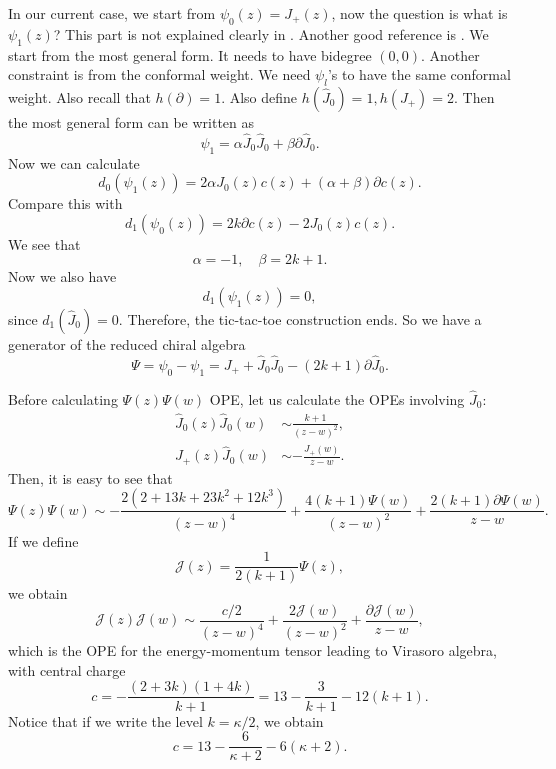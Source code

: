 \documentclass[a4paper,11pt]{article}
\begin{document}
In our current case, we start from $\psi_0(z) = J_+(z)$, now the question is what is $\psi_1(z)$? This part is not explained clearly in \cite{Beem:2014rza}. Another good reference is \cite{deBoer:1993iz}. We start from the most general form. It needs to have bidegree $(0,0)$. Another constraint is from the conformal weight. We need $\psi_l$'s to have the same conformal weight. Also recall that $h(\partial) = 1$. Also define $h(\hat{J}_0) = 1, h(J_+) = 2$. Then the most general form can be written as
\begin{equation}
    \psi_1 = \alpha \hat{J}_0 \hat{J}_0 + \beta \partial \hat{J}_0.
\end{equation}
Now we can calculate 
\begin{equation}
    d_0(\psi_1(z)) = 2\alpha J_0(z) c(z) + (\alpha + \beta) \partial c(z).
\end{equation}
Compare this with
\begin{equation}
    d_1(\psi_0(z)) = 2k\partial c(z) - 2{J}_0(z) c(z).
\end{equation}
We see that
\begin{equation}
    \alpha = -1, \quad \beta = 2k+1.
\end{equation}
Now we also have
\begin{equation}
    d_1(\psi_1(z)) = 0,
\end{equation}
since $d_1 (\hat{J}_0) = 0$. Therefore, the tic-tac-toe construction ends. So we have a generator of the reduced chiral algebra
\begin{equation}
    {\Psi} = \psi_0 - \psi_1 = J_+ +  \hat{J}_0 \hat{J}_0 - (2k+1) \partial \hat{J}_0.
\end{equation}

Before calculating $\Psi(z) \Psi(w)$ OPE, let us calculate 
the OPEs involving $\hat{J}_0$:
\begin{align}
    \hat{J}_0 (z) \hat{J}_0(w) &\sim \frac{k+1}{(z-w)^2},\\
    J_+(z) \hat{J}_0(w) &\sim -\frac{J_+(w)}{z-w}.
\end{align}
Then, it is easy to see that
\begin{equation}
    \Psi(z) \Psi(w) \sim -\frac{2(2+13k +23k^2+12 k^3)}{(z-w)^4} + \frac{4(k+1) \Psi(w)}{(z-w)^2} + \frac{2(k+1) \partial\Psi(w)}{z-w}.
\end{equation}
If we define
\begin{equation}
    \mathcal{J}(z) = \frac{1}{2(k+1)} \Psi(z),
\end{equation}
we obtain
\begin{equation}
    \mathcal{J}(z) \mathcal{J}(w) \sim \frac{c/2}{(z-w)^4} + \frac{2 \mathcal{J}(w)}{(z-w)^2} + \frac{\partial \mathcal{J}(w)}{z-w},
\end{equation}
which is the OPE for the energy-momentum tensor leading to Virasoro algebra, with central charge
\begin{equation}
    c = -\frac{(2+3k)(1+4k)}{k+1} = 13 - \frac{3}{k+1} - 12 (k+1).
\end{equation}
Notice that if we write the level $k = \kappa/2$, we obtain
\begin{equation}
    c = 13 - \frac{6}{\kappa+2} - 6(\kappa+2).
\end{equation}
\end{document}
